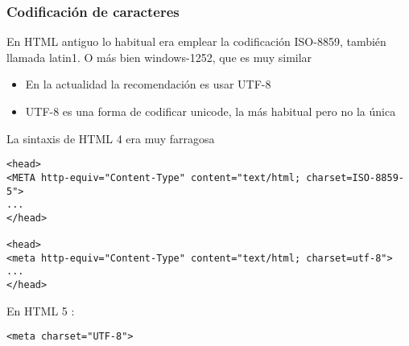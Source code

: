 \documentclass[ucs]{beamer}
\begin{document}
\begin{frame}[fragile]
\frametitle{Codificación de caracteres}
En HTML antiguo lo habitual era emplear la codificación ISO-8859, también llamada latin1. O más bien
windows-1252, que es muy similar
\begin{itemize}
\item
En la actualidad la recomendación es usar UTF-8
    \item
UTF-8 es una forma de codificar unicode, la más habitual pero no la única
\end{itemize}



\end{frame}

\begin{frame}[fragile]



La sintaxis de HTML 4 era muy farragosa

  \begin{scriptsize}
  \begin{verbatim}
<head>
<META http-equiv="Content-Type" content="text/html; charset=ISO-8859-5">
...
</head>

<head>
<meta http-equiv="Content-Type" content="text/html; charset=utf-8">
...
</head>
  \end{verbatim}
  \end{scriptsize}


En HTML 5 :

  \begin{footnotesize}
  \begin{verbatim}
<meta charset="UTF-8">
  \end{verbatim}
  \end{footnotesize}



\end{frame}
\end{document}
